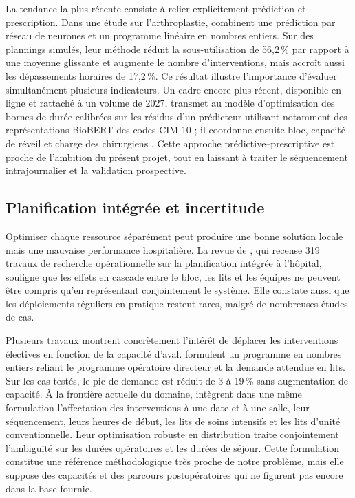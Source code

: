 La tendance la plus récente consiste à relier explicitement prédiction et prescription. Dans une étude sur l'arthroplastie, \textcite{lex2026} combinent une prédiction par réseau de neurones et un programme linéaire en nombres entiers. Sur des plannings simulés, leur méthode réduit la sous-utilisation de 56,2\,\% par rapport à une moyenne glissante et augmente le nombre d'interventions, mais accroît aussi les dépassements horaires de 17,2\,\%. Ce résultat illustre l'importance d'évaluer simultanément plusieurs indicateurs. Un cadre encore plus récent, disponible en ligne et rattaché à un volume de 2027, transmet au modèle d'optimisation des bornes de durée calibrées sur les résidus d'un prédicteur utilisant notamment des représentations BioBERT des codes CIM-10 ; il coordonne ensuite bloc, capacité de réveil et charge des chirurgiens \parencite{kayvanfar2027}. Cette approche prédictive--prescriptive est proche de l'ambition du présent projet, tout en laissant à traiter le séquencement intrajournalier et la validation prospective.

\subsection{Planification intégrée et incertitude}

Optimiser chaque ressource séparément peut produire une bonne solution locale mais une mauvaise performance hospitalière. La revue de \textcite{rachuba2024}, qui recense 319 travaux de recherche opérationnelle sur la planification intégrée à l'hôpital, souligne que les effets en cascade entre le bloc, les lits et les équipes ne peuvent être compris qu'en représentant conjointement le système. Elle constate aussi que les déploiements réguliers en pratique restent rares, malgré de nombreuses études de cas.

Plusieurs travaux montrent concrètement l'intérêt de déplacer les interventions électives en fonction de la capacité d'aval. \textcite{carter2024} formulent un programme en nombres entiers reliant le programme opératoire directeur et la demande attendue en lits. Sur les cas testés, le pic de demande est réduit de 3 à 19\,\% sans augmentation de capacité. À la frontière actuelle du domaine, \textcite{shehadeh2026} intègrent dans une même formulation l'affectation des interventions à une date et à une salle, leur séquencement, leurs heures de début, les lits de soins intensifs et les lits d'unité conventionnelle. Leur optimisation robuste en distribution traite conjointement l'ambiguïté sur les durées opératoires et les durées de séjour. Cette formulation constitue une référence méthodologique très proche de notre problème, mais elle suppose des capacités et des parcours postopératoires qui ne figurent pas encore dans la base fournie.

